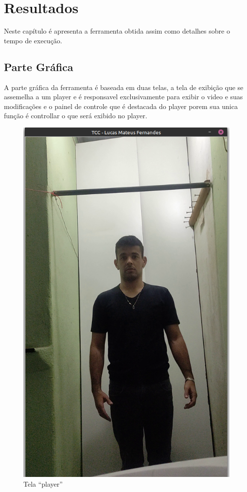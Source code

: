 \chapter{Resultados}

Neste capítulo é apresenta a ferramenta obtida assim como detalhes sobre o tempo de execução.


\section[Parte Gráfica]{Parte Gráfica}

A parte gráfica da ferramenta é baseada em duas telas, a tela de exibição que se assemelha a um player e é responsavel exclusivamente para exibir o video e suas modificações e o painel de controle que é destacada do player porem sua unica função é controllar o que será exibido no player.


\begin{figure}[!htb]
	\centering
	\includegraphics[scale=0.25]{figuras/view/player.png}
	\caption{Tela ``player''}
\end{figure}


